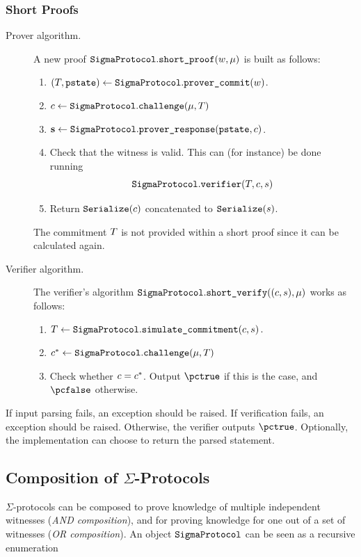 \documentclass[11pt]{article}
\begin{document}
\subsubsection{Short Proofs}\label{sec:shortproof}
\begin{description}
\item[Prover algorithm.]
A new proof $\texttt{SigmaProtocol}.\texttt{short\_proof}(w, \mu)$ is built as follows:
\begin{enumerate}
  \item
     $(T,\texttt{pstate})\gets\texttt{SigmaProtocol}.\texttt{prover\_commit}(w)$.
  \item
   $c \gets \texttt{SigmaProtocol}.\texttt{challenge}(\mu,  T)$
  \item
     $\mathbf {s}\gets\texttt{SigmaProtocol}.\texttt{prover\_response}(\texttt{pstate},c)$.
    \item Check that the witness is valid. This can (for instance) be done running \[\texttt{SigmaProtocol}.\texttt{verifier}(T, c, s)\]
  \item
  Return $\texttt{Serialize}(c)$ concatenated to $\texttt{Serialize}(s)$.
\end{enumerate}
The commitment $T$ is not provided within a short proof since it can be calculated again.
\item[Verifier algorithm.] The verifier's algorithm $\texttt{SigmaProtocol}.\texttt{short\_verify}( (c, s), \mu)$ works as follows:
\begin{enumerate}
  \item $T \gets \texttt{SigmaProtocol}.\texttt{simulate\_commitment}(c, s)\,.$
  \item $c^* \gets \texttt{SigmaProtocol}.\texttt{challenge}(\mu, T)$
  \item
  Check whether $c=c^*$.
  Output $\accept$ if this is the case, and $\reject$ otherwise.
\end{enumerate}
\end{description}

If input parsing fails, an exception should be raised.
If verification fails, an exception should be raised.
Otherwise, the verifier outputs $\pctrue$. Optionally, the implementation can choose to return the parsed statement.





\subsection{Composition of $\Sigma$-Protocols}
\label{sec:composition}
\label{sec:or-comp}
\label{sec:and-comp}
  $\Sigma$-protocols can be composed to prove knowledge of multiple independent witnesses (\emph{AND composition}), and for proving knowledge for one out of a set of witnesses (\emph{OR composition}). An object $\texttt{SigmaProtocol}$ can be seen as a recursive enumeration
\end{document}
